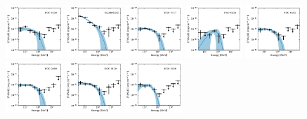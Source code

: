\documentclass[doublespace,nopageskip]{VTthesis}
\begin{document}
\begin{appendices}
\begin{figure}
\includegraphics[width=0.19\textwidth]{Figures/Globular/spectra/PLE_spectrum_20.pdf}
\includegraphics[width=0.19\textwidth]{Figures/Globular/spectra/PLE_spectrum_2.pdf}
\includegraphics[width=0.19\textwidth]{Figures/Globular/spectra/PLE_spectrum_23.pdf}
\includegraphics[width=0.19\textwidth]{Figures/Globular/spectra/PLE_spectrum_10.pdf}
\includegraphics[width=0.19\textwidth]{Figures/Globular/spectra/PLE_spectrum_17.pdf}
\includegraphics[width=0.19\textwidth]{Figures/Globular/spectra/PLE_spectrum_5.pdf}
\includegraphics[width=0.19\textwidth]{Figures/Globular/spectra/PLE_spectrum_9.pdf}
\includegraphics[width=0.19\textwidth]{Figures/Globular/spectra/PLE_spectrum_25.pdf}

\end{figure}
\end{appendices}
\end{document}
